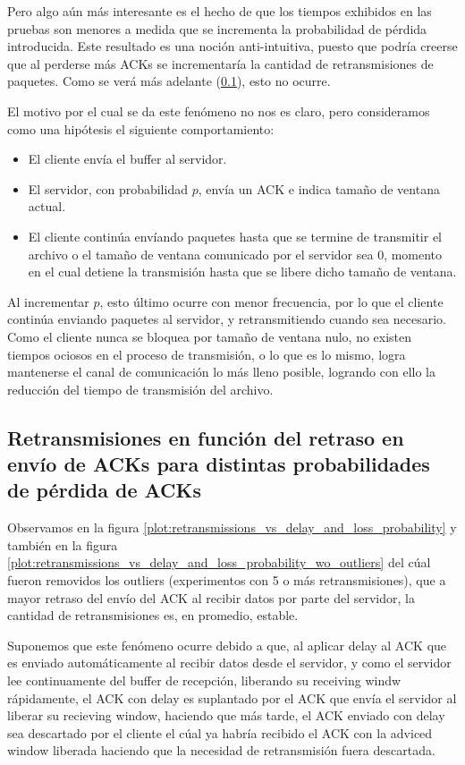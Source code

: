 \documentclass[a4paper, 10pt, twoside]{article}
\begin{document}
Pero algo aún más interesante es el hecho de que los tiempos exhibidos en las pruebas son menores a medida que se incrementa la probabilidad de pérdida introducida. Este resultado es una noción anti-intuitiva, puesto que podría creerse que al perderse más ACKs se incrementaría la cantidad de retransmisiones de paquetes. Como se verá más adelante (\ref{sec:retr_vs_delay_and_loss}), esto no ocurre.

El motivo por el cual se da este fenómeno no nos es claro, pero consideramos como una hipótesis el siguiente comportamiento:

\begin{itemize}
  \item El cliente envía el buffer al servidor.
  \item El servidor, con probabilidad $p$, envía un ACK e indica tamaño de ventana actual.
  \item El cliente continúa envíando paquetes hasta que se termine de transmitir el archivo o el tamaño de ventana comunicado por el servidor sea 0, momento en el cual detiene la transmisión hasta que se libere dicho tamaño de ventana.
\end{itemize}

Al incrementar $p$, esto último ocurre con menor frecuencia, por lo que el cliente continúa enviando paquetes al servidor, y retransmitiendo cuando sea necesario. Como el cliente nunca se bloquea por tamaño de ventana nulo, no existen tiempos ociosos en el proceso de transmisión, o lo que es lo mismo, logra mantenerse el canal de comunicación lo más lleno posible, logrando con ello la reducción del tiempo de transmisión del archivo.


\subsection{Retransmisiones en función del retraso en envío de ACKs para distintas probabilidades de pérdida de ACKs} \label{sec:retr_vs_delay_and_loss}

Observamos en la figura \ref{plot:retransmissions_vs_delay_and_loss_probability} y también en la figura \ref{plot:retransmissions_vs_delay_and_loss_probability_wo_outliers} del cúal fueron removidos los outliers (experimentos con 5 o más retransmisiones), que a mayor retraso del envío del ACK al recibir datos por parte del servidor, la cantidad de retransmisiones es, en promedio, estable.

Suponemos que este fenómeno ocurre debido a que, al aplicar delay al ACK que es enviado automáticamente al recibir datos desde el servidor, y como el servidor lee continuamente del buffer de recepción, liberando su receiving windw rápidamente, el ACK con delay es suplantado por el ACK que envía el servidor al liberar su recieving window, haciendo que más tarde, el ACK enviado con delay sea descartado por el cliente el cúal ya habría recibido el ACK con la adviced window liberada haciendo que la necesidad de retransmisión fuera descartada.
\end{document}
